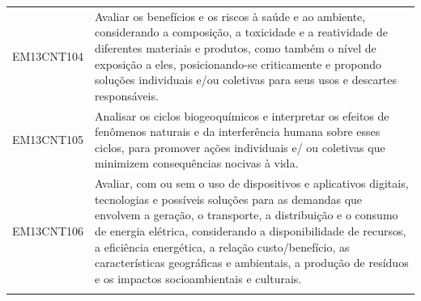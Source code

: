 \documentclass[12pt]{extarticle}
\begin{document}
\begin{longtable}{ll}
EM13CNT104 & Avaliar os benefícios e os riscos à saúde e ao ambiente, considerando a composição, a toxicidade e a reatividade de diferentes materiais e produtos, como também o nível de exposição a eles, posicionando-se criticamente e propondo soluções individuais e/ou coletivas para seus usos e descartes responsáveis.                                                                                                                                                                                                                                                                                                                                                                                                                                                                                                    \\
\rowcolor[HTML]{FFF} 
EM13CNT105 & Analisar os ciclos biogeoquímicos e interpretar os efeitos de fenômenos naturais e da interferência humana sobre esses ciclos, para promover ações individuais e/ ou coletivas que minimizem consequências nocivas à vida.                                                                                                                                                                                                                                                                                                                                                                                                                                                                                                                                                                                            \\
\rowcolor[HTML]{E0F7FA} 
EM13CNT106 & Avaliar, com ou sem o uso de dispositivos e aplicativos digitais, tecnologias e possíveis soluções para as demandas que envolvem a geração, o transporte, a distribuição e o consumo de energia elétrica, considerando a disponibilidade de recursos, a eficiência energética, a relação custo/benefício, as características geográficas e ambientais, a produção de resíduos e os impactos socioambientais e culturais.                                                                                                                                                                                                                                                                                                                                                                                              \\
\rowcolor[HTML]{FFF} 

\end{longtable}
\end{document}

